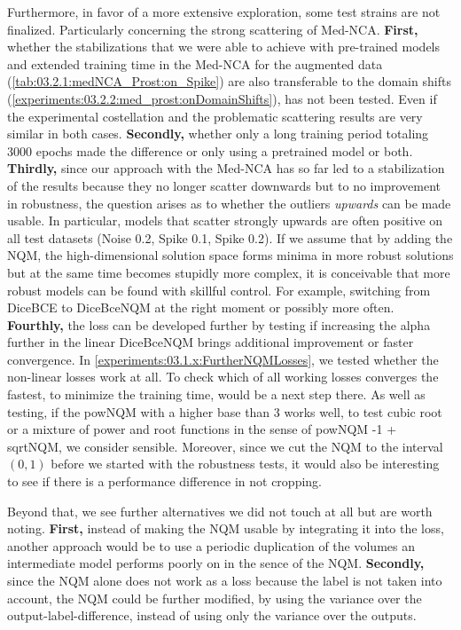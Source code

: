 Furthermore, in favor of a more extensive exploration, some test strains are not finalized. Particularly concerning the strong scattering of Med-NCA. \textbf{First,} whether the stabilizations that we were able to achieve with pre-trained models and extended training time in the Med-NCA for the augmented data (\autoref{tab:03.2.1:medNCA_Prost:on_Spike}) are also transferable to the domain shifts (\autoref{experiments:03.2.2:med_prost:onDomainShifts}), has not been tested. Even if the experimental costellation and the problematic scattering results are very similar in both cases. \textbf{Secondly,} whether only a long training period totaling 3000 epochs made the difference or only using a pretrained model or both. \textbf{Thirdly,} since our approach with the Med-NCA has so far led to a stabilization of the results because they no longer scatter downwards but to no improvement in robustness, the question arises as to whether the outliers \textit{upwards} can be made usable. In particular, models that scatter strongly upwards are often positive on all test datasets (Noise 0.2, Spike 0.1, Spike 0.2). If we assume that by adding the NQM, the high-dimensional solution space forms minima in more robust solutions but at the same time becomes stupidly more complex, it is conceivable that more robust models can be found with skillful control. For example, switching from DiceBCE to DiceBceNQM at the right moment or possibly more often. 
\textbf{Fourthly,} the loss can be developed further by testing if increasing the alpha further in the linear DiceBceNQM brings additional improvement or faster convergence. In \autoref{experiments:03.1.x:FurtherNQMLosses}, we tested whether the non-linear losses work at all. To check which of all working losses converges the fastest, to minimize the training time, would be a next step there. As well as testing, if the powNQM with a higher base than 3 works well, to test cubic root or a mixture of power and root functions in the sense of powNQM -1 + sqrtNQM, we consider sensible. Moreover, since we cut the NQM to the interval $(0,1)$ before we started with the robustness tests, it would also be interesting to see if there is a performance difference in not cropping.


Beyond that, we see further alternatives we did not touch at all but are worth noting.
\textbf{First,} instead of making the NQM usable by integrating it into the loss, another approach would be to use a periodic duplication of the volumes an intermediate model performs poorly on in the sence of the NQM. 
\textbf{Secondly,} since the NQM alone does not work as a loss because the label is not taken into account, the NQM could be further modified, by using the variance over the output-label-difference, instead of using only the variance over the outputs.